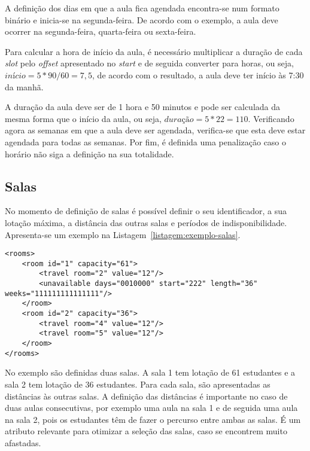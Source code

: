 A definição dos dias em que a aula fica agendada encontra-se num formato binário e inicia-se na segunda-feira. De acordo com o exemplo, a aula deve ocorrer na segunda-feira, quarta-feira ou sexta-feira.

Para calcular a hora de início da aula, é necessário multiplicar a duração de cada \textit{slot} pelo \textit{offset} apresentado no \textit{start} e de seguida converter para horas, ou seja, $início = 5*90/60 = 7,5$, de acordo com o resultado, a aula deve ter início às 7:30 da manhã.

A duração da aula deve ser de 1 hora e 50 minutos e pode ser calculada da mesma forma que o início da aula, ou seja, $duração = 5*22 = 110$. Verificando agora as semanas em que a aula deve ser agendada, verifica-se que esta deve estar agendada para todas as semanas. Por fim, é definida uma penalização caso o horário não siga a definição na sua totalidade.

\subsection{Salas}

No momento de definição de salas é possível definir o seu identificador, a sua lotação máxima, a distância das outras salas e períodos de indisponibilidade. Apresenta-se um exemplo na Listagem~\ref{listagem:exemplo-salas}.

\begin{minipage}[c]{\linewidth}
\begin{lstlisting}[caption={Exemplo da definição das salas.}, label={listagem:exemplo-salas}]
<rooms>
    <room id="1" capacity="61">
        <travel room="2" value="12"/>
        <unavailable days="0010000" start="222" length="36" weeks="111111111111111"/>
    </room>
    <room id="2" capacity="36">
        <travel room="4" value="12"/>
        <travel room="5" value="12"/>
    </room>
</rooms>
\end{lstlisting}
\end{minipage}

No exemplo são definidas duas salas. A sala 1 tem lotação de 61 estudantes e a sala 2 tem lotação de 36 estudantes. Para cada sala, são apresentadas as distâncias às outras salas. A definição das distâncias é importante no caso de duas aulas consecutivas, por exemplo uma aula na sala 1 e de seguida uma aula na sala 2, pois os estudantes têm de fazer o percurso entre ambas as salas. É um atributo relevante para otimizar a seleção das salas, caso se encontrem muito afastadas.

